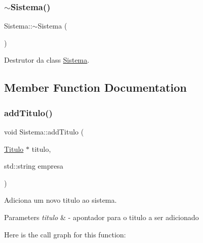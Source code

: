\mbox{\label{class_sistema_aafc86e0f2c3d734fb4c0985f70c27a1a}} 
\subsubsection{\texorpdfstring{$\sim$\+Sistema()}{~Sistema()}}
{\footnotesize\ttfamily Sistema\+::$\sim$\+Sistema (\begin{DoxyParamCaption}{ }\end{DoxyParamCaption})}



Destrutor da class \mbox{\hyperlink{class_sistema}{Sistema}}. 



\subsection{Member Function Documentation}
\mbox{\label{class_sistema_a1136080a3cf835831bf94908d419ae42}} 
\subsubsection{\texorpdfstring{add\+Titulo()}{addTitulo()}}
{\footnotesize\ttfamily void Sistema\+::add\+Titulo (\begin{DoxyParamCaption}\item[{\mbox{\hyperlink{class_titulo}{Titulo}} $\ast$}]{titulo,  }\item[{std\+::string}]{empresa }\end{DoxyParamCaption})}



Adiciona um novo titulo ao sistema. 


\begin{DoxyParams}{Parameters}
{\em titulo} & -\/ apontador para o titulo a ser adicionado \\
\hline
\end{DoxyParams}
Here is the call graph for this function\+:
\mbox{\label{class_sistema_aa91f2955f6b47f4dc0523b86b94c6309}} 
